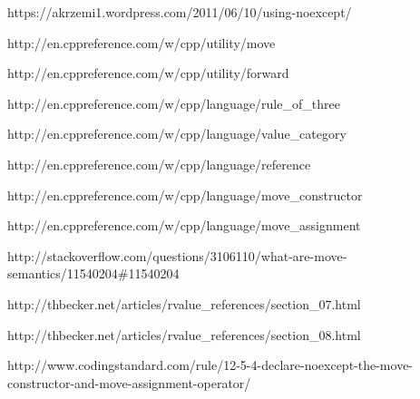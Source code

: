 \documentclass{article}
\begin{document}
https://akrzemi1.wordpress.com/2011/06/10/using-noexcept/

http://en.cppreference.com/w/cpp/utility/move

http://en.cppreference.com/w/cpp/utility/forward

http://en.cppreference.com/w/cpp/language/rule\_of\_three

http://en.cppreference.com/w/cpp/language/value\_category

http://en.cppreference.com/w/cpp/language/reference

http://en.cppreference.com/w/cpp/language/move\_constructor

http://en.cppreference.com/w/cpp/language/move\_assignment

http://stackoverflow.com/questions/3106110/what-are-move-semantics/11540204\#11540204

http://thbecker.net/articles/rvalue\_references/section\_07.html

http://thbecker.net/articles/rvalue\_references/section\_08.html

http://www.codingstandard.com/rule/12-5-4-declare-noexcept-the-move-constructor-and-move-assignment-operator/

\newpage
\end{document}
